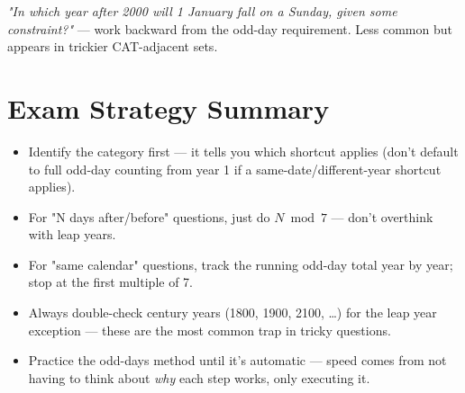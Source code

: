 \documentclass[11pt]{article}
\begin{document}
\begin{formulabox}
\textit{"In which year after 2000 will 1 January fall on a Sunday, given some constraint?"} --- work
backward from the odd-day requirement. Less common but appears in trickier CAT-adjacent sets.
\end{formulabox}

\section{Exam Strategy Summary}
\begin{itemize}[leftmargin=1.4em]
  \item Identify the category first --- it tells you which shortcut applies (don't default to full
    odd-day counting from year 1 if a same-date/different-year shortcut applies).
  \item For "N days after/before" questions, just do $N \bmod 7$ --- don't overthink with leap years.
  \item For "same calendar" questions, track the running odd-day total year by year; stop at the
    first multiple of 7.
  \item Always double-check century years (1800, 1900, 2100, \ldots) for the leap year exception ---
    these are the most common trap in tricky questions.
  \item Practice the odd-days method until it's automatic --- speed comes from not having to think
    about \emph{why} each step works, only executing it.
\end{itemize}
\end{document}
